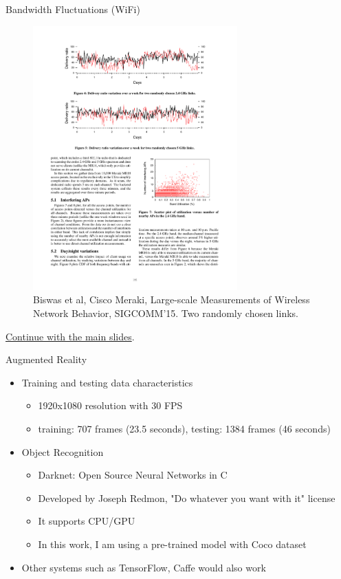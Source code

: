 \begin{frame}{Bandwidth Fluctuations (WiFi)}
  \footnotesize
  \begin{figure}
    \includegraphics[width=0.7\textwidth]{figures/bandwidth-wifi.pdf}
    \caption{Biswas et al, Cisco Meraki, Large-scale Measurements of Wireless
      Network Behavior, SIGCOMM'15. Two randomly chosen links.}
  \end{figure}

  \hyperlink{aws-variation}{Continue with the main slides}.
\end{frame}

\begin{frame}{Augmented Reality}
  \begin{itemize}
  \item Training and testing data characteristics
    \begin{itemize}
    \item 1920x1080 resolution with 30 FPS
    \item training: 707 frames (23.5 seconds), testing: 1384 frames (46 seconds)
    \end{itemize}
  \item Object Recognition
    \begin{itemize}
    \item Darknet: Open Source Neural Networks in C
    \item Developed by Joseph Redmon, "Do whatever you want with it" license
    \item It supports CPU/GPU
    \item In this work, I am using a pre-trained model with Coco dataset
    \end{itemize}
  \item Other systems such as TensorFlow, Caffe would also work
  \end{itemize}
\end{frame}

